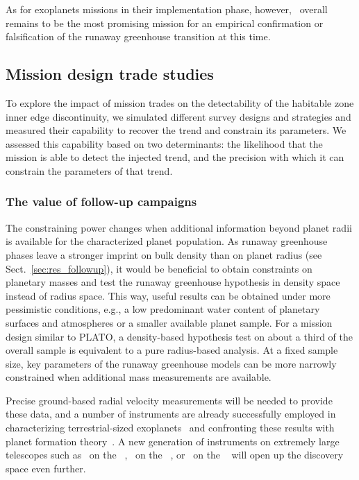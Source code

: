 \documentclass[twocolumn,twocolappendix]{aastex631}
\begin{document}
As for exoplanets missions in their implementation phase, however, \plato\ overall remains to be the most promising mission for an empirical confirmation or falsification of the runaway greenhouse transition at this time.


\subsection{Mission design trade studies}\label{sec:mission-design-trades}
To explore the impact of mission trades on the detectability of the habitable zone inner edge discontinuity, we simulated different survey designs and strategies and measured their capability to recover the trend and constrain its parameters.
We assessed this capability based on two determinants: the likelihood that the mission is able to detect the injected trend, and the precision with which it can constrain the parameters of that trend.

\subsubsection{The value of follow-up campaigns}
The constraining power changes when additional information beyond planet radii is available for the characterized planet population.
As runaway greenhouse phases leave a stronger imprint on bulk density than on planet radius (see Sect.~\ref{sec:res_followup}), it would be beneficial to obtain constraints on planetary masses and test the runaway greenhouse hypothesis in density space instead of radius space.
This way, useful results can be obtained under more pessimistic conditions, e.g., a low predominant water content of planetary surfaces and atmospheres or a smaller available planet sample.
For a mission design similar to PLATO, a density-based hypothesis test on about a third of the overall sample is equivalent to a pure radius-based analysis.
At a fixed sample size, key parameters of the runaway greenhouse models can be more narrowly constrained when additional mass measurements are available.

Precise ground-based radial velocity measurements will be needed to provide these data, and a number of instruments are already successfully employed in characterizing terrestrial-sized exoplanets~\citep[e.g.,][]{Queloz2001a,Pepe2010,Johnson2010b,Ribas2023} and confronting these results with planet formation theory~\citep[e.g.,][]{Miguel2020a,Burn2021,Zawadzki2021a,Schlecker2022}.
A new generation of instruments on extremely large telescopes such as \gclef\ on the \gmt ~\citep{Szentgyorgyi2016}, \andes\ on the \elt ~\citep{Marcantonio2022}, or \modhis\ on the \tmt ~\citep{Mawet2019} will open up the discovery space even further.
\end{document}
